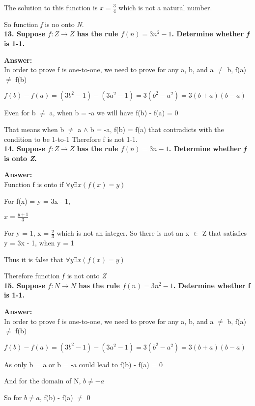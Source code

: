 \documentclass{article}
\begin{document}
\begin{large}
The solution to this function is $x = \frac{3}{4}$ which is not a natural number.

So function \emph{f} is no onto \emph{N}.\\

\textbf{13. Suppose $f:Z\to Z$ has the rule $f(n)=3{n^{2}}-1$. Determine whether \emph{f} is 1-1.}

\textbf{Answer:} \\

In order to prove f is one-to-one, we need to prove for any a, b, and a $\neq$ b, f(a) $\neq$ f(b)

$f(b) - f(a) = (3b^2 - 1) - (3a^2 - 1) = 3(b^2 - a^2) = 3(b + a)(b - a)$

Even for b $\neq$ a, when b = -a we will have f(b) - f(a) = 0

That means when b $\neq$ a $\land$ b = -a, f(b) = f(a) that contradicts with the condition to be 1-to-1
Therefore f is not 1-1.\\


\textbf{14. Suppose $f:Z\to Z$ has the rule $f(n)=3n-1$. Determine whether \emph{f} is onto \emph{Z}.}

\textbf{Answer:} \\

Function f is onto if $\forall y \exists x (f(x) = y)$

For f(x) = y = 3x - 1, 

$x = \frac{y+1}{3}$

For y = 1, x = $\frac{2}{3}$ which is not an integer. So there is not an x $\in$ Z that satisfies y = 3x - 1, when y = 1

Thus it is false that $\forall y \exists x (f(x) = y)$

Therefore function $\emph{f}$ is not onto $\emph{Z}$\\


\textbf{15. Suppose $f:N\to N$ has the rule $f(n)=3{n^{2}}-1$. Determine whether f is 1-1.}

\textbf{Answer:} \\

In order to prove f is one-to-one, we need to prove for any a, b, and a $\neq$ b, f(a) $\neq$ f(b)

$f(b) - f(a) = (3b^2 - 1) - (3a^2 - 1) = 3(b^2 - a^2) = 3(b + a)(b - a)$

As only b = a or b = -a could lead to f(b) - f(a) = 0

And for the domain of N, $b \neq -a$

So for $b \neq a$, f(b) - f(a) $\neq$ 0


\end{large}
\end{document}
